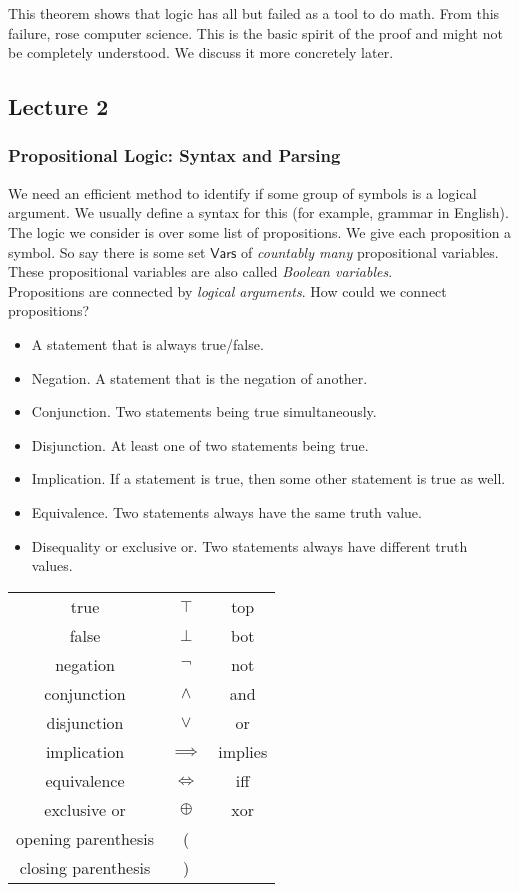 This theorem shows that logic has all but failed as a tool to do math. From this failure, rose computer science. This is the basic spirit of the proof and might not be completely understood. We discuss it more concretely later.

\subsection{Lecture 2}

\subsubsection{Propositional Logic: Syntax and Parsing}

We need an efficient method to identify if some group of symbols is a logical argument. We usually define a syntax for this (for example, grammar in English).\\

The logic we consider is over some list of propositions. We give each proposition a symbol. So say there is some set $\mathsf{Vars}$ of \textit{countably many} propositional variables.
These propositional variables are also called \textit{Boolean variables}.\\
Propositions are connected by \textit{logical arguments}. How could we connect propositions?
\begin{itemize}
    \item A statement that is always true/false.
    \item Negation. A statement that is the negation of another.
    \item Conjunction. Two statements being true simultaneously.
    \item Disjunction. At least one of two statements being true.
    \item Implication. If a statement is true, then some other statement is true as well.
    \item Equivalence. Two statements always have the same truth value.
    \item Disequality or exclusive or. Two statements always have different truth values.
\end{itemize}

\begin{center}
\begin{tabular}{c|c|c}
     true & $\top$ & top  \\
     false & $\perp$ & bot \\
     negation & $\neg$ & not \\
     conjunction & $\wedge$ & and \\
     disjunction & $\vee$ & or \\
     implication & $\implies$ & implies \\
     equivalence & $\iff$ & iff \\
     exclusive or & $\oplus$ & xor \\
     opening parenthesis & ( & \\
     closing parenthesis & ) &
\end{tabular}
\end{center}

